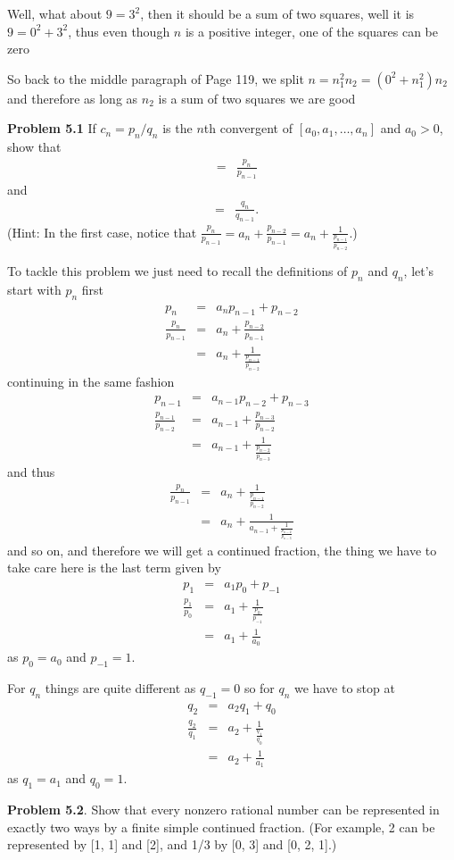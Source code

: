 \documentclass[aps,preprint,preprintnumbers,nofootinbib,showpacs,prd]{revtex4-1}
\newcommand{\nbea}{\begin{eqnarray*}}
\newcommand{\neea}{\end{eqnarray*}}
\begin{document}
Well, what about $9 = 3^2$, then it should be a sum of two squares, well it is $9 = 0^2 + 3^2$, thus even though $n$ is a positive integer, one of the squares can be zero

So back to the middle paragraph of Page 119, we split $n = n_1^2n_2 = (0^2 + n_1^2)n_2$ and therefore as long as $n_2$ is a sum of two squares we are good

{\bf Problem 5.1} If $c_n = p_n /q_n$ is the $n$th convergent of $[a_0 , a_1 , \dots , a_n ]$ and $a_0 > 0$, show that
%
\nbea
[a_n , a_{n-1} , \dots , a_1 , a_0 ] & = & \frac{p_n}{p_{n-1}}
\neea
%
and
%
\nbea
[a_n , a_{n-1} , \dots , a_2 , a_1 ] & = & \frac{q_n}{q_{n-1}}.
\neea
%
(Hint: In the first case, notice that $\frac{p_n}{p_{n-1}} = a_n + \frac{p_{n-2}}{p_{n-1}} = a_n + \frac{1}{\frac{p_{n-1}}{p_{n-2}}}$.)

To tackle this problem we just need to recall the definitions of $p_n$ and $q_n$, let's start with $p_n$ first
%
\nbea
p_n & = & a_np_{n-1} + p_{n-2} \\
\frac{p_n}{p_{n-1}} & = & a_n + \frac{p_{n-2}}{p_{n-1}} \\
& = & a_n + \frac{1}{\frac{p_{n-1}}{p_{n-2}}}
\neea
%
continuing in the same fashion 
%
\nbea
p_{n-1} & = & a_{n-1}p_{n-2} + p_{n-3} \\
\frac{p_{n-1}}{p_{n-2}} & = & a_{n-1} + \frac{p_{n-3}}{p_{n-2}} \\
& = & a_{n-1} + \frac{1}{\frac{p_{n-2}}{p_{n-3}}}
\neea
%
and thus
%
\nbea
\frac{p_n}{p_{n-1}} & = & a_n + \frac{1}{\frac{p_{n-1}}{p_{n-2}}} \\
& = & a_n + \frac{1}{a_{n-1} + \frac{1}{\frac{p_{n-2}}{p_{n-3}}}}
\neea
%
and so on, and therefore we will get a continued fraction, the thing we have to take care here is the last term given by
%
\nbea
p_1 & = & a_1p_0 + p_{-1} \\
\frac{p_1}{p_0} & = & a_1 + \frac{1}{\frac{p_0}{p_{-1}}} \\
& = &  a_1 + \frac{1}{a_0}
\neea
%
as $p_0 = a_0$ and $p_{-1} = 1$.

For $q_n$ things are quite different as $q_{-1} = 0$ so for $q_n$ we have to stop at
%
\nbea
q_2 & = & a_2q_1 + q_0 \\
\frac{q_2}{q_1} & = & a_2 + \frac{1}{\frac{q_1}{q_0}} \\
& = & a_2 + \frac{1}{a_1}
\neea
%
as $q_1 = a_1$ and $q_0 = 1$.


{\bf Problem 5.2}. Show that every nonzero rational number can be represented in exactly two ways by a finite simple continued fraction. (For example, 2 can be represented by [1, 1] and [2], and 1/3 by [0, 3] and [0, 2, 1].)
\end{document}
